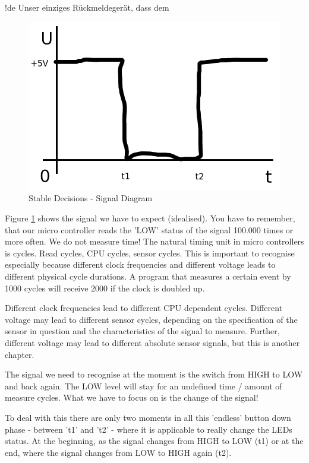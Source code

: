 !de Unser einziges Rückmeldegerät, dass dem 



\begin{figure}[htbp]
  \centering
  \includegraphics[width=120mm]{LED/S005_stable-decisions_ideal_signal.png}
  \caption{Stable Decisions - Signal Diagram}
  \label{S005SignalDiagam}
\end{figure}

Figure \ref{S005SignalDiagam} shows the signal we have to expect (idealised). You have to remember, that our micro controller reads the 'LOW' status of the signal 100.000 times or more often. We do not measure time! The natural timing unit in micro controllers is cycles. Read cycles, CPU cycles, sensor cycles. This is important to recognise especially because different clock frequencies and different voltage leads to different physical cycle durations. A program that measures a certain event by 1000 cycles will receive 2000 if the clock is doubled up.

Different clock frequencies lead to different CPU dependent cycles. Different voltage may lead to different sensor cycles, depending on the specification of the sensor in question and the characteristics of the signal to measure. Further, different voltage may lead to different absolute sensor signals, but this is another chapter.

The signal we need to recognise at the moment is the switch from HIGH to LOW and back again. The LOW level will stay for an undefined time / amount of measure cycles. What we have to focus on is the change of the signal!

To deal with this there are only two moments in all this 'endless' button down phase - between 't1' and 't2' - where it is applicable to really change the LEDs status. At the beginning, as the signal changes from HIGH to LOW (t1) or at the end, where the signal changes from LOW to HIGH again (t2).

